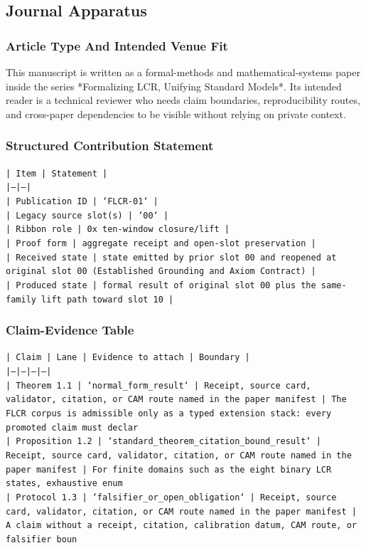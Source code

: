 \documentclass[11pt]{article}
\begin{document}
\subsection*{Journal Apparatus}

\subsubsection*{Article Type And Intended Venue Fit}

This manuscript is written as a formal-methods and mathematical-systems paper
inside the series *Formalizing LCR, Unifying Standard Models*. Its intended
reader is a technical reviewer who needs claim boundaries, reproducibility
routes, and cross-paper dependencies to be visible without relying on private
context.

\subsubsection*{Structured Contribution Statement}

\noindent\texttt{| Item | Statement |}\\
\noindent\texttt{|---|---|}\\
\noindent\texttt{| Publication ID | `FLCR-01` |}\\
\noindent\texttt{| Legacy source slot(s) | `00` |}\\
\noindent\texttt{| Ribbon role | 0x ten-window closure/lift |}\\
\noindent\texttt{| Proof form | aggregate receipt and open-slot preservation |}\\
\noindent\texttt{| Received state | state emitted by prior slot 00 and reopened at original slot 00 (Established Grounding and Axiom Contract) |}\\
\noindent\texttt{| Produced state | formal result of original slot 00 plus the same-family lift path toward slot 10 |}\\

\subsubsection*{Claim-Evidence Table}

\noindent\texttt{| Claim | Lane | Evidence to attach | Boundary |}\\
\noindent\texttt{|---|---|---|---|}\\
\noindent\texttt{| Theorem 1.1 | `normal\_form\_result` | Receipt, source card, validator, citation, or CAM route named in the paper manifest | The FLCR corpus is admissible only as a typed extension stack: every promoted claim must declar}\\
\noindent\texttt{| Proposition 1.2 | `standard\_theorem\_citation\_bound\_result` | Receipt, source card, validator, citation, or CAM route named in the paper manifest | For finite domains such as the eight binary LCR states, exhaustive enum}\\
\noindent\texttt{| Protocol 1.3 | `falsifier\_or\_open\_obligation` | Receipt, source card, validator, citation, or CAM route named in the paper manifest | A claim without a receipt, citation, calibration datum, CAM route, or falsifier boun}\\
\end{document}
